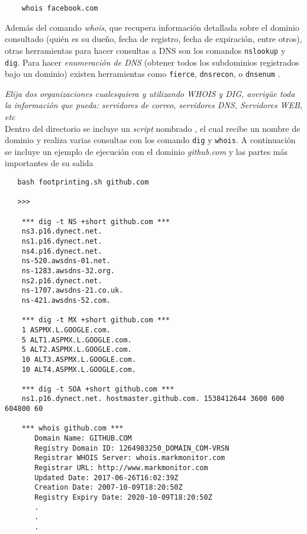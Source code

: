 \begin{lstlisting}
    whois facebook.com
\end{lstlisting}

Además del comando \emph{whois}, que recupera información detallada sobre el dominio consultado (quién es su dueño, fecha de registro, fecha de expiración, entre otros), otras herramientas para hacer consultas a DNS son los comandos \texttt{nslookup} y \texttt{dig}. Para hacer \emph{enumeración de DNS} (obtener todos los subdominios registrados bajo un dominio) existen herramientas como \texttt{fierce}, \texttt{dnsrecon}, o \texttt{dnsenum} \autocite{DNSEnumerationTools}.   

\emph{Elija dos organizaciones cualesquiera y utilizando WHOIS y DIG, averigüe toda la información que pueda: servidores de correo, servidores DNS, Servidores WEB, etc} 
~\\

Dentro del directorio  se incluye un \emph{script} nombrado , el cual recibe un nombre de dominio y realiza varias consultas con los comando \texttt{dig} y \texttt{whois}. A continuación se incluye un ejemplo de ejecución con el dominio \emph{github.com} y las partes más importantes de su salida

\begin{lstlisting}
   bash footprinting.sh github.com 

   >>>

    *** dig -t NS +short github.com ***
    ns3.p16.dynect.net.
    ns1.p16.dynect.net.
    ns4.p16.dynect.net.
    ns-520.awsdns-01.net.
    ns-1283.awsdns-32.org.
    ns2.p16.dynect.net.
    ns-1707.awsdns-21.co.uk.
    ns-421.awsdns-52.com.

    *** dig -t MX +short github.com ***
    1 ASPMX.L.GOOGLE.com.
    5 ALT1.ASPMX.L.GOOGLE.com.
    5 ALT2.ASPMX.L.GOOGLE.com.
    10 ALT3.ASPMX.L.GOOGLE.com.
    10 ALT4.ASPMX.L.GOOGLE.com.

    *** dig -t SOA +short github.com ***
    ns1.p16.dynect.net. hostmaster.github.com. 1538412644 3600 600 604800 60

    *** whois github.com ***
       Domain Name: GITHUB.COM
       Registry Domain ID: 1264983250_DOMAIN_COM-VRSN
       Registrar WHOIS Server: whois.markmonitor.com
       Registrar URL: http://www.markmonitor.com
       Updated Date: 2017-06-26T16:02:39Z
       Creation Date: 2007-10-09T18:20:50Z
       Registry Expiry Date: 2020-10-09T18:20:50Z
       .
       .
       .
\end{lstlisting}

